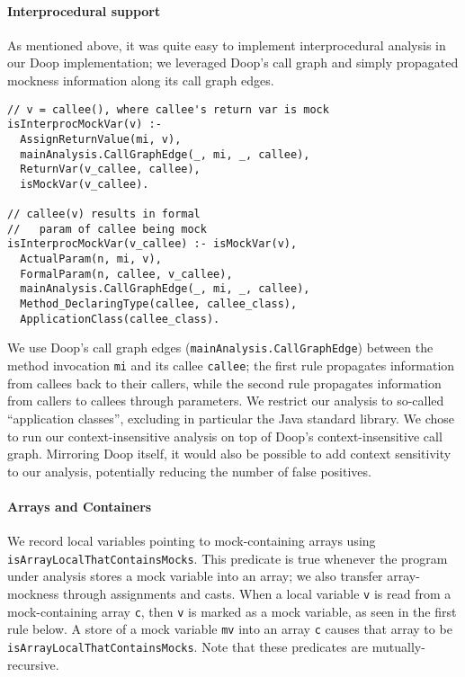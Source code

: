 \paragraph{Interprocedural support}
As mentioned above, it was quite easy to implement interprocedural analysis in our Doop implementation; we leveraged Doop's call graph and simply propagated mockness information along its call graph edges.

\begin{lstlisting}[basicstyle=\ttfamily\small,numbers=none,caption={Two rules give interprocedural analysis in Doop.},
basicstyle=\scriptsize\ttfamily, framesep=4.5mm, framexleftmargin=1.0mm, captionpos=b, label=lis:interproc-rule, escapechar=!]
// v = callee(), where callee's return var is mock
isInterprocMockVar(v) :-
  AssignReturnValue(mi, v),
  mainAnalysis.CallGraphEdge(_, mi, _, callee),
  ReturnVar(v_callee, callee),
  isMockVar(v_callee).

// callee(v) results in formal
//   param of callee being mock
isInterprocMockVar(v_callee) :- isMockVar(v),
  ActualParam(n, mi, v),
  FormalParam(n, callee, v_callee),
  mainAnalysis.CallGraphEdge(_, mi, _, callee),
  Method_DeclaringType(callee, callee_class),
  ApplicationClass(callee_class).
\end{lstlisting}
We use Doop's call graph edges (\texttt{mainAnalysis.CallGraphEdge}) between the method invocation {\tt mi} and its callee {\tt callee}; the first rule propagates information from callees back to their callers, while the second rule propagates information from callers to callees through parameters. We restrict our analysis to so-called ``application classes'', excluding in particular the Java standard library. We chose to run our context-insensitive analysis on top of Doop's context-insensitive call graph. Mirroring Doop itself, it would also be possible to add context sensitivity to our analysis, potentially reducing the number of false positives.%
\paragraph{Arrays and Containers} We record local variables pointing to mock-containing arrays using  {\tt isArrayLocalThatContainsMocks}. This predicate is true whenever the program under analysis stores a mock variable into an array; we also transfer array-mockness through assignments and casts. When a local variable \texttt{v} is read from a mock-containing array \texttt{c}, then \texttt{v} is marked as a mock variable, as seen in the first rule below. A store of a mock variable \texttt{mv} into an array \texttt{c} causes that array to be \texttt{isArrayLocalThatContainsMocks}. Note that these predicates are mutually-recursive. 

